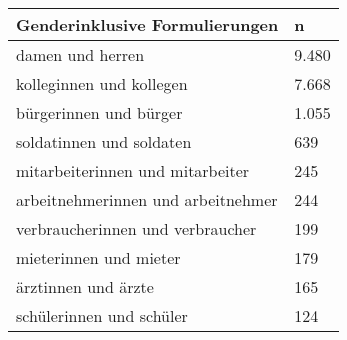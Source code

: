 
\begin{tabular}{ll}
\toprule
Genderinklusive Formulierungen & n\\
\midrule
damen und herren & 9.480\\
kolleginnen und kollegen & 7.668\\
bürgerinnen und bürger & 1.055\\
soldatinnen und soldaten & 639\\
mitarbeiterinnen und mitarbeiter & 245\\
arbeitnehmerinnen und arbeitnehmer & 244\\
verbraucherinnen und verbraucher & 199\\
mieterinnen und mieter & 179\\
ärztinnen und ärzte & 165\\
schülerinnen und schüler & 124\\
\bottomrule
\end{tabular}